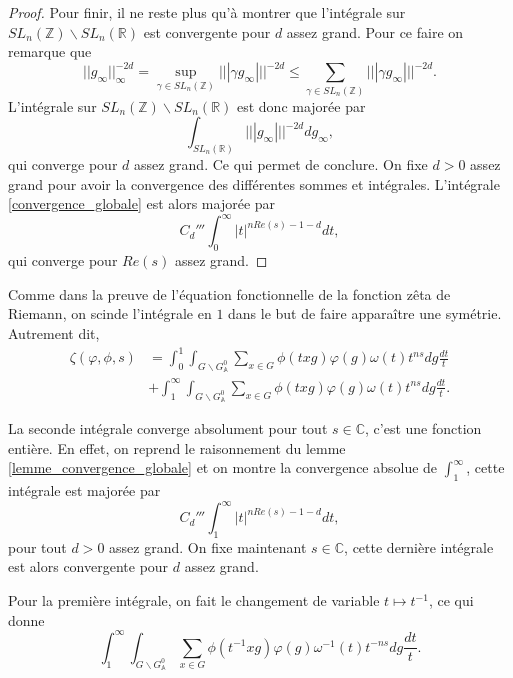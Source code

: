 \begin{proof}
Pour finir, il ne reste plus qu'à montrer que l'intégrale sur $SL_n(\mathbb{Z}) \backslash SL_n(\mathbb{R})$ est convergente pour $d$ assez grand. Pour ce faire on remarque que
\begin{equation}
||g_\infty||^{-2d}_\infty = \sup_{\gamma \in SL_n(\mathbb{Z})} |||\gamma g_\infty|||^{-2d} \leq \sum_{\gamma \in SL_n(\mathbb{Z})} |||\gamma g_\infty|||^{-2d}.
\end{equation}
L'intégrale sur $SL_n(\mathbb{Z}) \backslash SL_n(\mathbb{R})$ est donc majorée par
\begin{equation}
\int_{SL_n(\mathbb{R})} |||g_\infty|||^{-2d} dg_\infty,
\end{equation}
qui converge pour $d$ assez grand. Ce qui permet de conclure. On fixe $d > 0$ assez grand pour avoir la convergence des différentes sommes et intégrales. L'intégrale \ref{convergence_globale} est alors majorée par
\begin{equation}
C_d''' \int_0^\infty |t|^{nRe(s)-1-d} dt,
\end{equation}
qui converge pour $Re(s)$ assez grand.
\end{proof}

Comme dans la preuve de l'équation fonctionnelle de la fonction zêta de Riemann, on scinde l'intégrale en $1$ dans le but de faire apparaître une symétrie. Autrement dit,
\begin{equation}
\begin{split}
\zeta(\varphi, \phi, s) &= \int_0^1 \int_{G \backslash G^0_\mathbb{A}} \sum_{x \in G}{\phi(txg)} \varphi(g) \omega(t) t^{ns} dg \frac{dt}{t} \\
&+ \int_1^\infty \int_{G \backslash G^0_\mathbb{A}} \sum_{x \in G}{\phi(txg)} \varphi(g) \omega(t) t^{ns} dg \frac{dt}{t}.
\end{split}
\end{equation}

La seconde intégrale converge absolument pour tout $s \in \mathbb{C}$, c'est une fonction entière. En effet, on reprend le raisonnement du lemme \ref{lemme_convergence_globale} et on montre la convergence absolue de $\int_1^\infty$, cette intégrale est majorée par
\begin{equation}
C_d''' \int_1^\infty |t|^{nRe(s)-1-d} dt,
\end{equation}
pour tout $d > 0$ assez grand. On fixe maintenant $s \in \mathbb{C}$, cette dernière intégrale est alors convergente pour $d$ assez grand.

Pour la première intégrale, on fait le changement de variable $t \mapsto t^{-1}$, ce qui donne
\begin{equation}
\int_1^\infty \int_{G \backslash G^0_\mathbb{A}} \sum_{x \in G}{\phi(t^{-1}xg)} \varphi(g) \omega^{-1}(t) t^{-ns} dg \frac{dt}{t}.
\end{equation}

